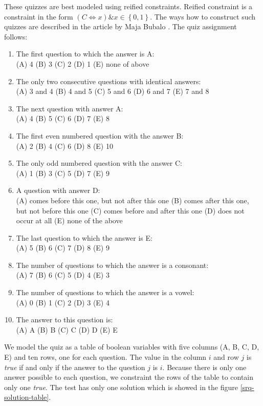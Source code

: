 These quizzes are best modeled using reified constraints. Reified constraint is a constraint
in the form $(C \Leftrightarrow x) \& x \in \left\{0,1\right\}$. The ways how to construct
such quizzes are described in the article by Maja Bubalo \cite{jios:bubalo}.
The quiz assignment follows:

\begin{enumerate}
	\item The first question to which the answer is A:\\
		(A) 4 (B) 3 (C) 2 (D) 1 (E) none of above
	\item The only two consecutive questions with identical answers: \\
		(A) 3 and 4 (B) 4 and 5 (C) 5 and 6 (D) 6 and 7 (E) 7 and 8
	\item The next question with answer A: \\
		(A) 4 (B) 5 (C) 6 (D) 7 (E) 8
	\item The first even numbered question with the answer B: \\
		(A) 2 (B) 4 (C) 6 (D) 8 (E) 10 
	\item The only odd numbered question with the answer C: \\
		(A) 1 (B) 3 (C) 5 (D) 7 (E) 9
	\item A question with answer D: \\
		(A) comes before this one, but not after this one (B) comes after this one, but not before this one (C) comes before and after this one (D) does not occur at all (E) none of the above
	\item The last question to which the answer is E: \\
		(A) 5 (B) 6 (C) 7 (D) 8 (E) 9
	\item The number of questions to which the answer is a consonant: \\
		(A) 7 (B) 6 (C) 5 (D) 4 (E) 3
	\item The number of questions to which the answer is a vowel: \\
		(A) 0 (B) 1 (C) 2 (D) 3 (E) 4
	\item The answer to this question is: \\
		(A) A (B) B (C) C (D) D (E) E
\end{enumerate}

We model the quiz as a table of boolean variables with five columns (A, B, C, D, E) 
and ten rows, one for each question. The value in the column $i$ and row $j$ is
{\em true} if and only if the answer to the question $j$ is $i$. Because there is only one
answer possible to each question, we constraint the rows of the table to contain
only one {\em true}. The test has only one solution which is showed in the figure 
\ref{srq-solution-table}.  
 
